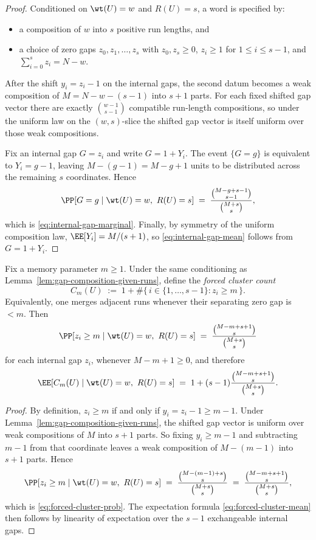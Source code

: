 \begin{proof}
Conditioned on $\wt(U)=w$ and $R(U)=s$, a word is specified by:
\begin{itemize}
\item a composition of $w$ into $s$ positive run lengths, and
\item a choice of zero gaps $z_0,z_1,\dots,z_s$ with $z_0,z_s\ge 0$, $z_i\ge 1$ for $1\le i\le s-1$, and
\(\sum_{i=0}^s z_i=N-w\).
\end{itemize}
After the shift $y_i=z_i-1$ on the internal gaps, the second datum becomes a weak composition of
$M=N-w-(s-1)$ into $s+1$ parts. For each fixed shifted gap vector there are exactly
$\binom{w-1}{s-1}$ compatible run-length compositions, so under the uniform law on the $(w,s)$-slice the shifted
gap vector is itself uniform over those weak compositions.

Fix an internal gap $G=z_i$ and write $G=1+Y_i$. The event $\{G=g\}$ is equivalent to $Y_i=g-1$, leaving
$M-(g-1)=M-g+1$ units to be distributed across the remaining $s$ coordinates. Hence
\[
\PP[G=g \mid \wt(U)=w,\ R(U)=s]
\;=\;
\frac{\binom{M-g+s-1}{s-1}}{\binom{M+s}{s}},
\]
which is \eqref{eq:internal-gap-marginal}. Finally, by symmetry of the uniform composition law,
$\EE[Y_i]=M/(s+1)$, so \eqref{eq:internal-gap-mean} follows from $G=1+Y_i$.
\end{proof}

\begin{corollary}
\label{cor:forced-cluster-count}
Fix a memory parameter $m\ge 1$. Under the same conditioning as
Lemma~\ref{lem:gap-composition-given-runs}, define the \emph{forced cluster count}
\[
C_m(U)
\;:=\;
1+\#\{\,i\in\{1,\dots,s-1\}: z_i\ge m\,\}.
\]
Equivalently, one merges adjacent runs whenever their separating zero gap is $<m$.
Then
\begin{equation}
\label{eq:forced-cluster-prob}
\PP[z_i\ge m \mid \wt(U)=w,\ R(U)=s]
\;=\;
\frac{\binom{M-m+s+1}{s}}{\binom{M+s}{s}}
\end{equation}
for each internal gap \(z_i\), whenever \(M-m+1\ge 0\), and therefore
\begin{equation}
\label{eq:forced-cluster-mean}
\EE[C_m(U)\mid \wt(U)=w,\ R(U)=s]
\;=\;
1+(s-1)\frac{\binom{M-m+s+1}{s}}{\binom{M+s}{s}}.
\end{equation}
\end{corollary}

\begin{proof}
By definition, \(z_i\ge m\) if and only if \(y_i=z_i-1\ge m-1\).
Under Lemma~\ref{lem:gap-composition-given-runs}, the shifted gap vector is uniform over weak compositions of
\(M\) into \(s+1\) parts. So fixing \(y_i\ge m-1\) and subtracting \(m-1\) from that coordinate leaves a weak
composition of \(M-(m-1)\) into \(s+1\) parts. Hence
\[
\PP[z_i\ge m \mid \wt(U)=w,\ R(U)=s]
\;=\;
\frac{\binom{M-(m-1)+s}{s}}{\binom{M+s}{s}}
\;=\;
\frac{\binom{M-m+s+1}{s}}{\binom{M+s}{s}},
\]
which is \eqref{eq:forced-cluster-prob}. The expectation formula
\eqref{eq:forced-cluster-mean} then follows by linearity of expectation over the \(s-1\) exchangeable internal gaps.
\end{proof}

